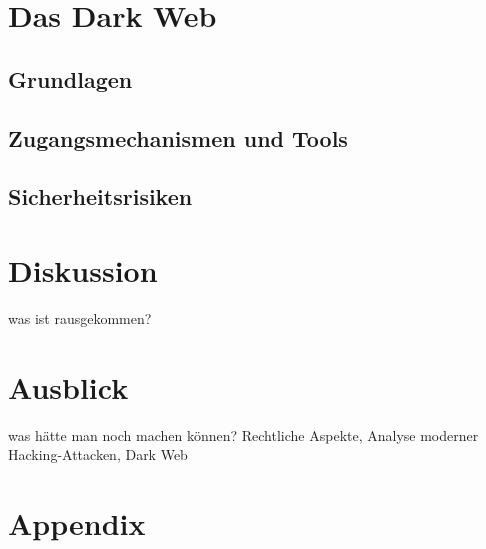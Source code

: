 \documentclass[11pt, a4paper]{article}
\begin{document}
\section{Das Dark Web}

\subsection{Grundlagen}

\subsection{Zugangsmechanismen und Tools}

\subsection{Sicherheitsrisiken}

\section{Diskussion}
was ist rausgekommen?

\section{Ausblick}
was hätte man noch machen können? Rechtliche Aspekte, Analyse moderner Hacking-Attacken, Dark Web


\appendix
\newpage
\renewcommand{\thesubsection}{\Alph{subsection}}
\pagebreak

\section{Appendix}
\end{document}
